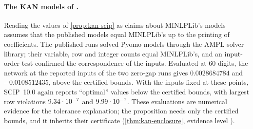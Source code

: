 \paragraph{The KAN models of \citet{karia2025-deterministic-global-optimization-over-trained}.}
Reading the values of \cref{prop:kan-scip} as claims about MINLPLib's models assumes that the published models equal MINLPLib's up to the printing of coefficients.
The published runs solved Pyomo models through the AMPL solver library; their variable, row and integer counts equal MINLPLib's, and an input-order test confirmed the correspondence of the inputs.
Evaluated at 60 digits, the network at the reported inputs of the two zero-gap runs gives $0.0028684784$ and $-0.0108512435$, above the certified bounds.
With the inputs fixed at these points, SCIP~10.0 again reports ``optimal'' values below the certified bounds, with largest row violations $9.34\cdot 10^{-7}$ and $9.99\cdot 10^{-7}$.
These evaluations are numerical evidence for the tolerance explanation; the proposition needs only the certified bounds, and it inherits their certificate (\cref{thm:kan-enclosure}, evidence level ).
